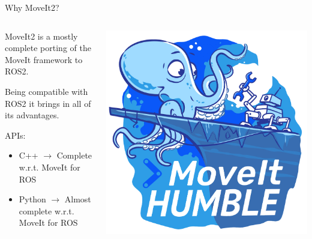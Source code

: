 \begin{frame}{Why MoveIt2?}
    \begin{columns}
        \begin{column}{.75\linewidth}
            MoveIt2 is a mostly complete porting of the MoveIt framework to ROS2.

            Being compatible with ROS2 it brings in all of its advantages.

            APIs:
            \begin{itemize}
                \item C++ $\rightarrow$ Complete w.r.t. MoveIt for ROS
                \item Python $\rightarrow$ Almost complete w.r.t. MoveIt for ROS
            \end{itemize}
        \end{column}
        \begin{column}{.25\linewidth}
            \begin{center}
                \includegraphics[width=\textwidth]{media/MoveIt2Humble.png}
            \end{center}
        \end{column}
    \end{columns}
\end{frame}
